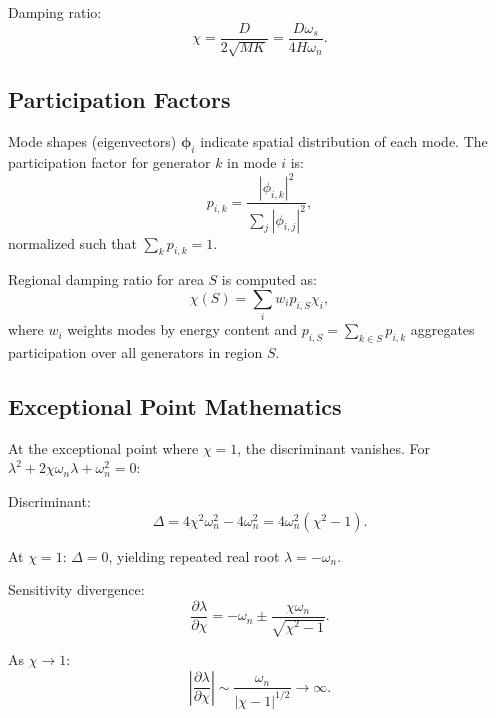 \documentclass[11pt,letterpaper]{article}
\newcommand{\symchi}{\chi}
\begin{document}
Damping ratio:
\begin{equation}
\symchi = \frac{D}{2\sqrt{MK}} = \frac{D\omega_s}{4H\omega_n}.
\end{equation}

\subsection{Participation Factors}

Mode shapes (eigenvectors) $\boldsymbol{\phi}_i$ indicate spatial distribution of each mode. The participation factor for generator $k$ in mode $i$ is:
\begin{equation}
p_{i,k} = \frac{|\phi_{i,k}|^2}{\sum_j |\phi_{i,j}|^2},
\end{equation}
normalized such that $\sum_k p_{i,k} = 1$.

Regional damping ratio for area $S$ is computed as:
\begin{equation}
\symchi(S) = \sum_i w_i p_{i,S} \symchi_i,
\end{equation}
where $w_i$ weights modes by energy content and $p_{i,S} = \sum_{k \in S} p_{i,k}$ aggregates participation over all generators in region $S$.

\subsection{Exceptional Point Mathematics}

At the exceptional point where $\symchi = 1$, the discriminant vanishes. For $\lambda^2 + 2\symchi\omega_n\lambda + \omega_n^2 = 0$:

Discriminant:
\begin{equation}
\Delta = 4\symchi^2\omega_n^2 - 4\omega_n^2 = 4\omega_n^2(\symchi^2 - 1).
\end{equation}

At $\symchi = 1$: $\Delta = 0$, yielding repeated real root $\lambda = -\omega_n$.

Sensitivity divergence:
\begin{equation}
\frac{\partial\lambda}{\partial\symchi} = -\omega_n \pm \frac{\symchi\omega_n}{\sqrt{\symchi^2 - 1}}.
\end{equation}

As $\symchi \to 1$:
\begin{equation}
\left|\frac{\partial\lambda}{\partial\symchi}\right| \sim \frac{\omega_n}{|\symchi - 1|^{1/2}} \to \infty.
\end{equation}
\end{document}

